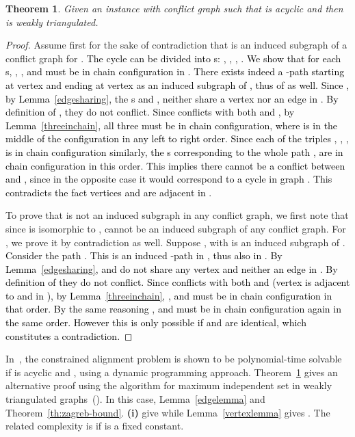 \documentclass[final]{dmtcs-episciences}
\newtheorem{theorem}{Theorem}
\newcommand\mar[1]{\textcolor{black}{#1}}
\begin{document}
\begin{theorem}
\label{th:weaklytriangl}
Given an instance  with conflict graph  such that  is acyclic and  then  is weakly triangulated. 
\end{theorem}
\begin{proof} 
Assume first for the sake of contradiction that   is an induced subgraph of a conflict graph for .
\mar{The cycle  can be divided into  s: , , , . 
We show that for each s, , ,  and  must be in chain configuration in . There exists indeed a -path starting at vertex  and ending 
at vertex  as an induced subgraph of , thus of  as well. Since , by Lemma~\ref{edgesharing}, 
the s  and , neither   
share a vertex nor an edge in . By definition of , they do not conflict. 
Since  conflicts with both  and , by Lemma~\ref{threeinchain}, all three must be in chain 
configuration, where  is in the middle of the configuration in any left to right order. 
Since each of the  triples , , ,  is in chain configuration similarly,
the s corresponding to the whole path ,  are in chain configuration in this order. This implies there cannot be a conflict between  and 
 , since in the opposite case it would correspond to a cycle in graph . This contradicts the fact vertices  and  are adjacent in }. 
 
To prove that  is not an induced subgraph in any conflict graph, we first note that
since  is isomorphic to ,  cannot be an induced subgraph 
of any conflict graph. For , we prove it by contradiction as well. Suppose , with  is an induced subgraph of .
\mar{Consider the path . This is an induced -path 
in , thus also in . By Lemma~\ref{edgesharing},  and  do not share any vertex and neither                                                                         an edge in . By definition of  they do not conflict.
Since   
conflicts with both  and  (vertex  is adjacent to  and  in ), by Lemma~\ref{threeinchain},
, and  must be in chain configuration in that order. By the same reasoning 
, and  must be in chain configuration again in the same order. However this is 
only possible if   and  are identical, which constitutes a contradiction.}   
\end{proof}



In~\citet{AbakaBE13}, the constrained alignment
problem is shown to be polynomial-time solvable  if  is acyclic and , using a dynamic programming approach. Theorem~\ref{th:weaklytriangl} gives an alternative proof using the  algorithm for maximum independent set in weakly triangulated graphs~(\citet{hayward2}). In this case, 
 Lemma~\ref{edgelemma} and Theorem~\ref{th:zagreb-bound}.\textbf{ (i)} give    while Lemma~\ref{vertexlemma} gives .
 The related complexity is  if  is a fixed constant. 
\end{document}

